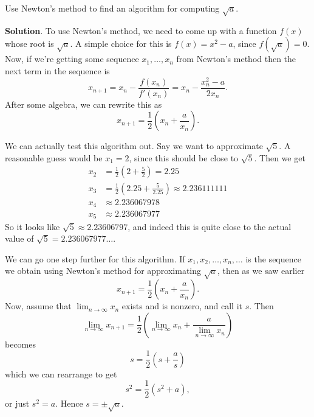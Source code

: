 \documentclass[10pt,]{book}
\theoremstyle{ptxplainnotitle}
\theoremstyle{ptxplaintitle}
\theoremstyle{ptxplainnotitle}
\theoremstyle{ptxplaintitle}
\theoremstyle{ptxplainnotitle}
\theoremstyle{ptxplaintitle}
\theoremstyle{ptxdefinitionnotitle}
\theoremstyle{ptxdefinitiontitle}
\theoremstyle{ptxdefinitionnotitle}
\theoremstyle{ptxdefinitiontitle}
\theoremstyle{ptxdefinitionnotitle}
\theoremstyle{ptxdefinitiontitle}
\theoremstyle{ptxdefinitionnotitle}
\theoremstyle{ptxdefinitiontitle}
\theoremstyle{ptxdefinitionnotitle}
\theoremstyle{ptxdefinitiontitle}
\numberwithin{equation}{section}
\begin{document}
\begin{example}\label{example-a-babylonian-problem}
\hypertarget{p-373}{}%
Use Newton's method to find an algorithm for computing \(\sqrt{a}\).%
\par\smallskip%
\noindent\textbf{Solution}.\hypertarget{solution-83}{}\quad%
\hypertarget{p-374}{}%
To use Newton's method, we need to come up with a function \(f(x)\) whose root is \(\sqrt{a}\). A simple choice for this is \(f(x) = x^{2} - a\), since \(f(\sqrt{a}) = 0\). Now, if we're getting some sequence \(x_{1},\ldots,x_{n}\) from Newton's method then the next term in the sequence is%
\begin{equation*}
x_{n+1} = x_{n} - \frac{f(x_{n})}{f'(x_{n})} = x_{n} - \frac{x_{n}^{2} - a}{2x_{n}}.
\end{equation*}
After some algebra, we can rewrite this as%
\begin{equation*}
x_{n+1} = \frac{1}{2}\left(x_{n} + \frac{a}{x_{n}}\right).
\end{equation*}
%
\par
\hypertarget{p-375}{}%
We can actually test this algorithm out. Say we want to approximate \(\sqrt{5}\). A reasonable guess would be \(x_{1} = 2\), since this should be close to \(\sqrt{5}\). Then we get%
\begin{align*}
x_{2} & = \frac{1}{2}\left(2 + \frac{5}{2}\right) = 2.25 \\
x_{3} & = \frac{1}{2}\left(2.25 + \frac{5}{2.25}\right) \approx 2.236111111 \\
x_{4} & \approx 2.236067978 \\
x_{5} & \approx 2.236067977 
\end{align*}
So it looks like \(\sqrt{5}\approx 2.23606797\), and indeed this is quite close to the actual value of \(\sqrt{5} = 2.236067977\ldots\).%
\par
\hypertarget{p-376}{}%
We can go one step further for this algorithm. If \(x_{1},x_{2},\ldots,x_{n},\ldots\) is the sequence we obtain using Newton's method for approximating \(\sqrt{a}\), then as we saw earlier%
\begin{equation*}
x_{n+1} = \frac{1}{2}\left(x_{n} + \frac{a}{x_{n}}\right).
\end{equation*}
Now, assume that \(\lim_{n\to\infty}x_{n}\) exists and is nonzero, and call it \(s\). Then%
\begin{equation*}
\lim_{n\to\infty}x_{n+1} = \frac{1}{2}\left(\lim_{n\to\infty}x_{n} + \frac{a}{\lim_{n\to\infty}x_{n}}\right)
\end{equation*}
becomes%
\begin{equation*}
s = \frac{1}{2}\left(s + \frac{a}{s}\right)
\end{equation*}
which we can rearrange to get%
\begin{equation*}
s^{2} = \frac{1}{2}(s^{2} + a),
\end{equation*}
or just \(s^{2} = a\). Hence \(s = \pm\sqrt{a}\).%
\end{example}
\typeout{************************************************}
\typeout{************************************************}
\end{document}

